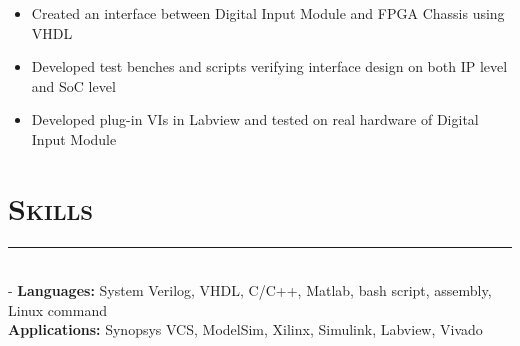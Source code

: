 \documentclass[11pt]{res}
\newcommand{\style}[1]{\color{Blue}\large\textsc{#1}}
\begin{document}
\begin{resume}
 \begin{itemize}[leftmargin=-0.1in]
   
  \item Created an interface between Digital Input Module and FPGA Chassis using VHDL\vspace{-5pt}
  \item Developed test benches and scripts verifying interface design on both IP level and SoC level \vspace{-5pt}
  \item Developed plug-in VIs in Labview and tested on real hardware of Digital Input Module\\
   \end{itemize}\vspace{-28pt}
   
   
\section{\style{Skills}}
\vspace{-10pt}
\rule{18cm}{0.5mm}\\
 -\sectionwidth \resumewidth
 \textbf{Languages:}  System Verilog, VHDL, C/C++, Matlab, bash script, assembly, Linux command    \hfill \vspace{-0.5mm}\\
  \textbf{Applications:} Synopsys VCS,  ModelSim, Xilinx, Simulink, Labview, Vivado\\%

   
   

\end{resume}
\end{document}
